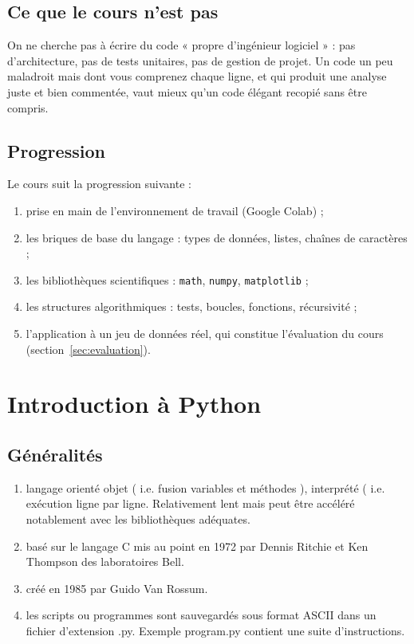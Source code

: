 \documentclass[a4paper,12pt]{article}
\begin{document}
\subsection{Ce que le cours n'est pas}
\begin{leftbar}
On ne cherche pas à écrire du code « propre d'ingénieur logiciel » : pas d'architecture, pas de tests unitaires, pas de gestion de projet. Un code un peu maladroit mais dont vous comprenez chaque ligne, et qui produit une analyse juste et bien commentée, vaut mieux qu'un code élégant recopié sans être compris.
\end{leftbar}

\subsection{Progression}
Le cours suit la progression suivante :
\begin{enumerate}
\item prise en main de l'environnement de travail (Google Colab) ;
\item les briques de base du langage : types de données, listes, chaînes de caractères ;
\item les bibliothèques scientifiques : \texttt{math}, \texttt{numpy}, \texttt{matplotlib} ;
\item les structures algorithmiques : tests, boucles, fonctions, récursivité ;
\item l'application à un jeu de données réel, qui constitue l'évaluation du cours (section~\ref{sec:evaluation}).
\end{enumerate}

\clearpage
\section{Introduction à Python}
\subsection{G\'en\'eralit\'es}
\begin{enumerate}
\item langage orient\'e objet ( i.e. fusion variables et m\'ethodes ), interpr\'et\'e ( i.e. ex\'ecution ligne par ligne. Relativement lent mais peut \^etre  acc\'el\'er\'e notablement avec les  biblioth\`eques ad\'equates.
\item bas\'e sur le langage C mis au point en 1972 par Dennis Ritchie et Ken Thompson des laboratoires Bell.
\item cr\'e\'e en 1985 par Guido Van Rossum.
\item les scripts ou programmes sont sauvegard\'es sous format ASCII dans un fichier d'extension .py. Exemple program.py contient une suite d'instructions.
\end{enumerate}
\end{document}
